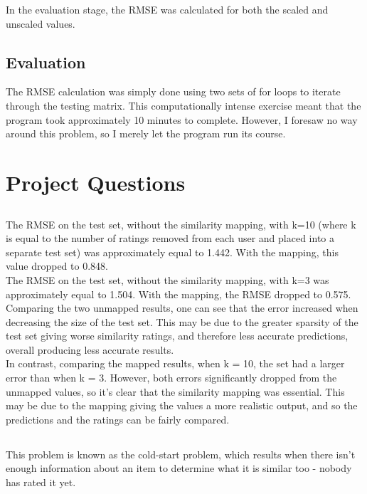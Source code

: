\documentclass{scrartcl}
\begin{document}
In the evaluation stage, the RMSE was calculated for both the scaled and unscaled values.

\subsection{Evaluation}

The RMSE calculation was simply done using two sets of for loops to iterate through the testing matrix. This computationally intense exercise meant that the program took approximately 10 minutes to complete. However, I foresaw no way around this problem, so I merely let the program run its course.\\

\newpage
\section{Project Questions}

\subsection{}
The RMSE on the test set, without the similarity mapping, with k=10 (where k is equal to the number of ratings removed from each user and placed into a separate test set) was approximately equal to 1.442. With the mapping, this value dropped to 0.848. \\

The RMSE on the test set, without the similarity mapping, with k=3 was approximately equal to 1.504. With the mapping, the RMSE dropped to 0.575.\\

Comparing the two unmapped results, one can see that the error increased when decreasing the size of the test set. This may be due to the greater sparsity of the test set giving worse similarity ratings, and therefore less accurate predictions, overall producing less accurate results.\\

In contrast, comparing the mapped results, when k = 10, the set had a larger error than when k = 3. However, both errors significantly dropped from the unmapped values, so it's clear that the similarity mapping was essential. This may be due to the mapping giving the values a more realistic output, and so the predictions and the ratings can be fairly compared.

\subsection{}
This problem is known as the cold-start problem, which results when there isn't enough information about an item to determine what it is similar too - nobody has rated it yet. \\
\end{document}
